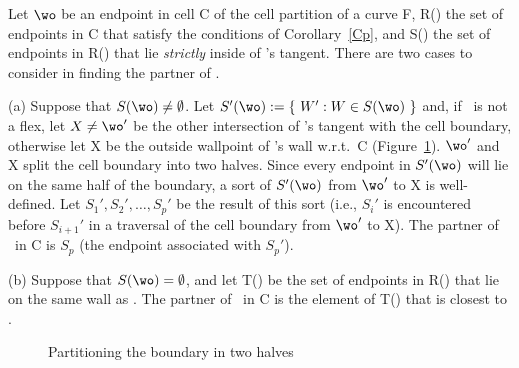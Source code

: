 \begin{theorem}
\label{Tpner}
Let $\wo$ be an endpoint in cell C of the cell partition of a curve F,
R(\wo) the set of endpoints
in C that satisfy the conditions of 
Corollary~\ref{Cp},
%
and S(\wo) the set of endpoints in R(\wo) that lie {\em strictly} inside of \wo's 
tangent.
There are two cases to consider in finding the partner of \wo.

(a) Suppose that $S(\wo) \neq \emptyset$. 
Let \mbox{$S'(\wo) := \{\ W':W \in S(\wo)\ \}$} and, 
if \wo\ is not a flex, let $X \neq \wo '$ be the other intersection of \wo's 
tangent with the cell boundary, otherwise let X be the outside wallpoint of \wo's 
wall w.r.t.\ C (Figure~\ref{3.8A}).
$\wo '$ and X split the cell boundary into two halves.
Since every endpoint in $S'(\wo)$ will lie on the same half of the boundary,
a sort of $S'(\wo)$ from $\wo '$ to X is well-defined.
Let $S_{1}',S_{2}',\ldots,S_{p}'$ be the result of this sort
(i.e., $S_{i}'$ is encountered before $S_{i+1}'$ in a traversal of the cell boundary 
from $\wo '$ to X).
The partner of \wo\ in C is $S_{p}$ (the endpoint associated with $S_{p}'$).

(b) Suppose that $S(\wo) = \emptyset$, and 
let T(\wo) be the set of endpoints in R(\wo) that lie on 
the same wall as \wo.
The partner of \wo\ in C is the element of T(\wo) that is closest to \wo.
\end{theorem}

\begin{figure}[htb]\vspace{2.1in}\caption{Partitioning the boundary in two halves}\label{3.8A}\end{figure}

